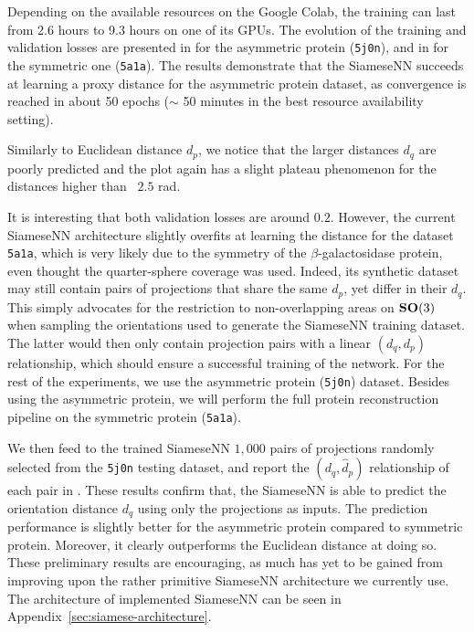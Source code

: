 Depending on the available resources on the Google Colab, the training can last from 2.6 hours to 9.3 hours on one of its GPUs.
The evolution of the training and validation losses are presented in  for the asymmetric protein (\texttt{5j0n}), and in  for the symmetric one (\texttt{5a1a}).
The results demonstrate that the SiameseNN succeeds at learning a proxy distance for the asymmetric protein dataset, as convergence is reached in about 50 epochs ($\sim$ 50 minutes in the best resource availability setting).

Similarly to Euclidean distance $d_p$, we notice that the larger distances $d_q$ are poorly predicted and the plot again has a slight plateau phenomenon for the distances higher than ~$2.5$ rad.

It is interesting that both validation losses are around $0.2$.
However, the current SiameseNN architecture slightly overfits at learning the distance for the dataset \texttt{5a1a}, which is very likely due to the symmetry of the $\beta$-galactosidase protein, even thought the quarter-sphere coverage was used.
Indeed, its synthetic dataset may still contain pairs of projections that share the same $d_p$, yet differ in their $d_q$.
This simply advocates for the restriction to non-overlapping areas on $\mathrm{\mathbf{SO}}(3)$ when sampling the orientations used to generate the SiameseNN training dataset.
The latter would then only contain projection pairs with a linear $(d_q,d_p)$ relationship, which should ensure a successful training of the network.
For the rest of the experiments, we use the asymmetric protein (\texttt{5j0n}) dataset.
Besides using the asymmetric protein, we will perform the full protein reconstruction pipeline on the symmetric protein (\texttt{5a1a}).

We then feed to the trained SiameseNN $1,000$ pairs of projections randomly selected from the \texttt{5j0n} testing dataset, and report the $(d_q,\widehat{d}_p)$ relationship of each pair in .
These results confirm that, the SiameseNN is able to predict the orientation distance $d_q$ using only the projections as inputs. The prediction performance is slightly better for the asymmetric protein compared to symmetric protein.
Moreover, it clearly outperforms the Euclidean distance at doing so.
These preliminary results are encouraging, as much has yet to be gained from improving upon the rather primitive SiameseNN architecture we currently use. The architecture of implemented SiameseNN can be seen in Appendix~\ref{sec:siamese-architecture}.

